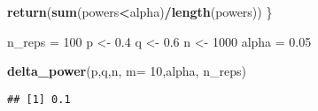 \documentclass[
]{article}
\newenvironment{Shaded}{\begin{snugshade}}{\end{snugshade}}
\newcommand{\DataTypeTok}[1]{\textcolor[rgb]{0.13,0.29,0.53}{#1}}
\newcommand{\DecValTok}[1]{\textcolor[rgb]{0.00,0.00,0.81}{#1}}
\newcommand{\FloatTok}[1]{\textcolor[rgb]{0.00,0.00,0.81}{#1}}
\newcommand{\KeywordTok}[1]{\textcolor[rgb]{0.13,0.29,0.53}{\textbf{#1}}}
\newcommand{\NormalTok}[1]{#1}
\newcommand{\OperatorTok}[1]{\textcolor[rgb]{0.81,0.36,0.00}{\textbf{#1}}}
\newcommand{\StringTok}[1]{\textcolor[rgb]{0.31,0.60,0.02}{#1}}
\begin{document}
\begin{Shaded}
\begin{Highlighting}[]
  \KeywordTok{return}\NormalTok{(}\KeywordTok{sum}\NormalTok{(powers}\OperatorTok{<}\NormalTok{alpha)}\OperatorTok{/}\KeywordTok{length}\NormalTok{(powers))}
\NormalTok{\}}

\NormalTok{n_reps =}\StringTok{ }\DecValTok{100}
\NormalTok{p <-}\StringTok{ }\FloatTok{0.4}
\NormalTok{q <-}\StringTok{ }\FloatTok{0.6}
\NormalTok{n <-}\StringTok{ }\DecValTok{1000}
\NormalTok{alpha =}\StringTok{ }\FloatTok{0.05}

\KeywordTok{delta_power}\NormalTok{(p,q,n, }\DataTypeTok{m=} \DecValTok{10}\NormalTok{,alpha,  n_reps)}
\end{Highlighting}
\end{Shaded}

\begin{verbatim}
## [1] 0.1
\end{verbatim}
\end{document}
